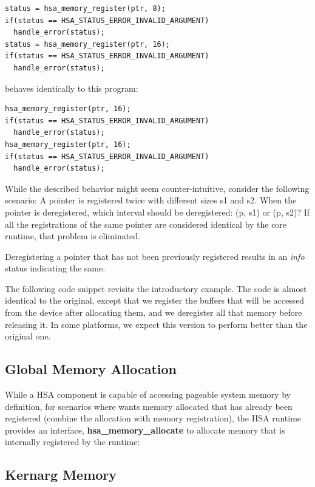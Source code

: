\documentclass[draft]{book}
\newcommand{\reffun}[1]{\textbf{#1}}
\begin{document}
\begin{lstlisting}
status = hsa_memory_register(ptr, 8);
if(status == HSA_STATUS_ERROR_INVALID_ARGUMENT)
  handle_error(status);
status = hsa_memory_register(ptr, 16);
if(status == HSA_STATUS_ERROR_INVALID_ARGUMENT)
  handle_error(status);
\end{lstlisting}

behaves identically to this program:

\begin{lstlisting}
hsa_memory_register(ptr, 16);
if(status == HSA_STATUS_ERROR_INVALID_ARGUMENT)
  handle_error(status);
hsa_memory_register(ptr, 16);
if(status == HSA_STATUS_ERROR_INVALID_ARGUMENT)
  handle_error(status);
\end{lstlisting}

While the described behavior might seem counter-intuitive, consider the
following scenario: A pointer is registered twice with different sizes s1 and
s2. When the pointer is deregistered, which interval should be deregistered: (p,
s1) or (p, s2)? If all the registrations of the same pointer are considered
identical by the core runtime, that problem is eliminated.

Deregistering a pointer that has not been previously registered results in an
\emph{info} status indicating the same.

The following code snippet revisits the introductory example. The code is almost
identical to the original, except that we register the buffers that will be
accessed from the device after allocating them, and we deregister all that
memory before releasing it. In some platforms, we expect this version to perform
better than the original one.


\hypertarget{globalmemory}{}\subsection{Global  Memory Allocation}\label{globalmemory}

While a HSA component is capable of accessing pageable system memory by
definition, for scenarios where wants memory allocated that has already been
registered (combine the allocation with memory registration), the HSA runtime
provides an interface, \reffun{hsa_memory_allocate} to allocate memory that is
internally registered by the runtime:



\hypertarget{kernarg}{}\subsection{Kernarg Memory}\label{kernargmem}
\end{document}
